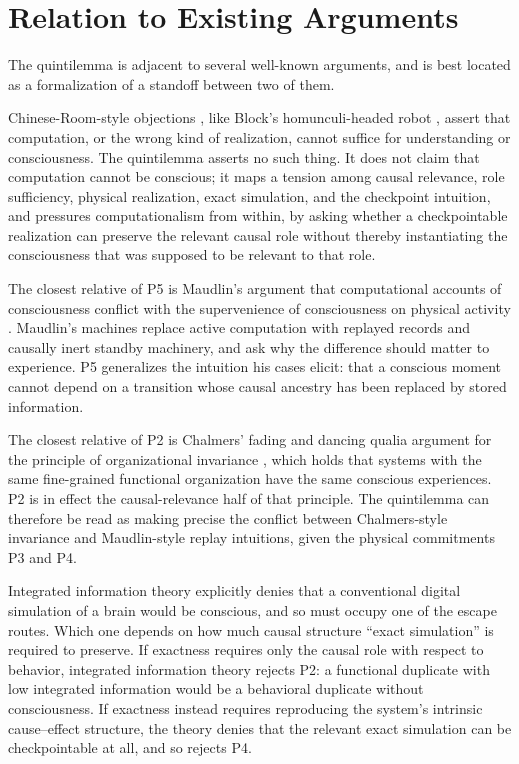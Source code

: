 \documentclass[11pt]{article}
\begin{document}
\section{Relation to Existing Arguments}

The quintilemma is adjacent to several well-known arguments, and is best
located as a formalization of a standoff between two of them.

Chinese-Room-style objections \cite{searle1980}, like Block's homunculi-headed
robot \cite{block1978}, assert that computation, or the wrong kind of
realization, cannot suffice for understanding or consciousness. The
quintilemma asserts no such thing. It does not claim that computation cannot
be conscious; it maps a tension among causal relevance, role sufficiency,
physical realization, exact simulation, and the checkpoint intuition, and
pressures computationalism from within, by asking whether a checkpointable
realization can preserve the relevant causal role without thereby
instantiating the consciousness that was supposed to be relevant to that role.

The closest relative of P5 is Maudlin's argument that computational accounts
of consciousness conflict with the supervenience of consciousness on physical
activity \cite{maudlin1989}. Maudlin's machines replace active computation
with replayed records and causally inert standby machinery, and ask why the
difference should matter to experience. P5 generalizes the intuition his cases
elicit: that a conscious moment cannot depend on a transition whose causal
ancestry has been replaced by stored information.

The closest relative of P2 is Chalmers' fading and dancing qualia argument for
the principle of organizational invariance \cite{chalmers1996}, which holds
that systems with the same fine-grained functional organization have the same
conscious experiences. P2 is in effect the causal-relevance half of that
principle. The quintilemma can therefore be read as making precise the
conflict between Chalmers-style invariance and Maudlin-style replay
intuitions, given the physical commitments P3 and P4.

Integrated information theory \cite{tononi2008,tononikoch2015} explicitly
denies that a conventional digital simulation of a brain would be conscious,
and so must occupy one of the escape routes. Which one depends on how much
causal structure ``exact simulation'' is required to preserve. If exactness
requires only the causal role with respect to behavior, integrated information
theory rejects P2: a functional duplicate with low integrated information
would be a behavioral duplicate without consciousness. If exactness instead
requires reproducing the system's intrinsic cause--effect structure, the
theory denies that the relevant exact simulation can be checkpointable at all,
and so rejects P4.
\end{document}
